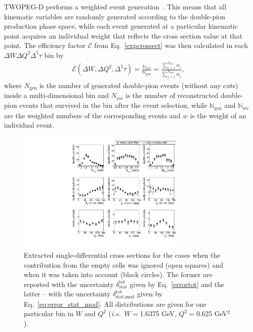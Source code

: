 \documentclass[prc,twocolumn,superscriptaddress,showpacs,amssymb,amsmath,amsfonts,aps,nofootinbib]{revtex4-1}
\begin{document}
TWOPEG-D performs a weighted event generation~\cite{twopeg}. This means that all kinematic variables are randomly generated according to the double-pion production phase space, while each event generated at a particular kinematic point acquires an individual weight that reflects the cross section value at that point.  The efficiency factor $\mathcal{E}$ from Eq.\!~\eqref{expcrossect} was then calculated in each $\Delta W\Delta Q^2\Delta^{5}\tau$ bin by
\begin{equation}
\begin{aligned}
\mathcal{E}(\Delta W, \Delta Q^2, \Delta^{5}\tau) = \frac{\mathbb{N}_{\text{rec}}}{\mathbb{N}_{\text{gen}}} =  \frac{\sum\limits_{i=1}^{N_{\text{rec}}} w_{i}}{\sum\limits_{j=1}^{N_{\text{gen}}} w_{j}} ,
\end{aligned}
\label{eq:eff}
\end{equation}
where $N_{\text{gen}}$ is the number of generated double-pion events (without any cuts) inside a multi-dimensional bin and $N_{\text{rec}}$ is the number of reconstructed double-pion events that survived in the bin after the event selection, while $\mathbb{N}_{\text{gen}}$ and  $\mathbb{N}_{\text{rec}}$ are the weighted numbers of the corresponding events and $w$ is the weight of an individual event.

\begin{figure}[htp]
\begin{center}
\includegraphics[width=0.75\textwidth]{pictures/corrections/cr_sec_all_top_new2.pdf}
\caption{\small Extracted single-differential cross sections for the cases when the contribution from the empty cells was ignored (open squares) and when it was taken into account (black circles). The former are reported with the uncertainty $\delta_{\text{stat}}^{\text{tot}}$ given by Eq.\!~\eqref{errortot} and the latter -- with the uncertainty $\delta_{\text{stat,mod}}^{\text{tot}}$ given by Eq.\!~\eqref{eq:error_stat_mod}. All distributions are given for one particular bin in $W$ and $Q^2$ ({\it i.e.}~$W = $1.6375 GeV, $Q^2 = $0.625 GeV$^2$).} \label{fig:empt_corr}
\end{center}
\end{figure}
\end{document}
